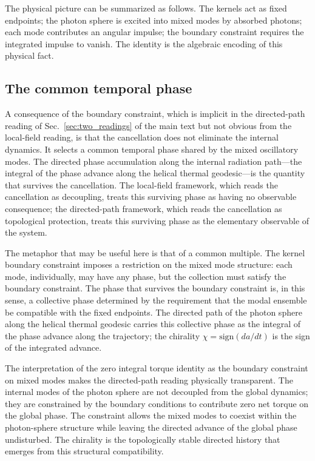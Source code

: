 \documentclass[%
 reprint, amsmath,amssymb, aps, prb, ]{revtex4-2}
\numberwithin{equation}{section}
\begin{document}
The physical picture can be summarized as follows. The kernels act as fixed endpoints; the photon sphere is excited into mixed modes by absorbed photons; each mode contributes an angular impulse; the boundary constraint requires the integrated impulse to vanish. The identity is the algebraic encoding of this physical fact.

\subsection{The common temporal phase}
\label{sec:common_phase}

A consequence of the boundary constraint, which is implicit in the directed-path reading of Sec.~\ref{sec:two_readings} of the main text but not obvious from the local-field reading, is that the cancellation does not eliminate the internal dynamics. It selects a common temporal phase shared by the mixed oscillatory modes. The directed phase accumulation along the internal radiation path---the integral of the phase advance along the helical thermal geodesic---is the quantity that survives the cancellation. The local-field framework, which reads the cancellation as decoupling, treats this surviving phase as having no observable consequence; the directed-path framework, which reads the cancellation as topological protection, treats this surviving phase as the elementary observable of the system.

The metaphor that may be useful here is that of a common multiple. The kernel boundary constraint imposes a restriction on the mixed mode structure: each mode, individually, may have any phase, but the collection must satisfy the boundary constraint. The phase that survives the boundary constraint is, in this sense, a collective phase determined by the requirement that the modal ensemble be compatible with the fixed endpoints. The directed path of the photon sphere along the helical thermal geodesic carries this collective phase as the integral of the phase advance along the trajectory; the chirality $\chi = \mathrm{sign}(da/dt)$ is the sign of the integrated advance.

The interpretation of the zero integral torque identity as the boundary constraint on mixed modes makes the directed-path reading physically transparent. The internal modes of the photon sphere are not decoupled from the global dynamics; they are constrained by the boundary conditions to contribute zero net torque on the global phase. The constraint allows the mixed modes to coexist within the photon-sphere structure while leaving the directed advance of the global phase undisturbed. The chirality is the topologically stable directed history that emerges from this structural compatibility.
\end{document}
